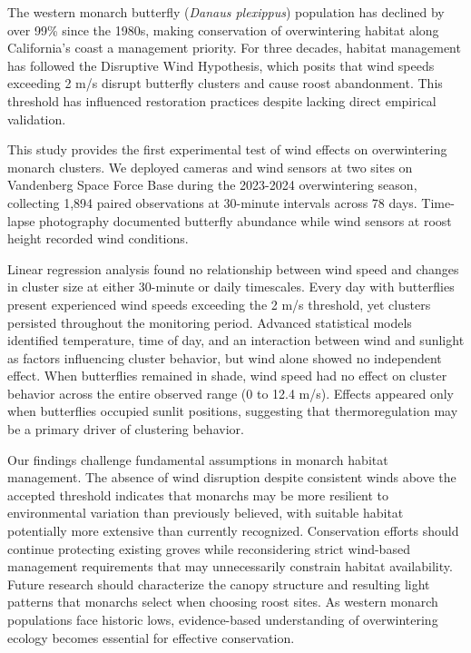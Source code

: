 The western monarch butterfly (\textit{Danaus plexippus}) population has declined by over 99\% since the 1980s, making conservation of overwintering habitat along California's coast a management priority. For three decades, habitat management has followed the Disruptive Wind Hypothesis, which posits that wind speeds exceeding 2 m/s disrupt butterfly clusters and cause roost abandonment. This threshold has influenced restoration practices despite lacking direct empirical validation.

This study provides the first experimental test of wind effects on overwintering monarch clusters. We deployed cameras and wind sensors at two sites on Vandenberg Space Force Base during the 2023-2024 overwintering season, collecting 1,894 paired observations at 30-minute intervals across 78 days. Time-lapse photography documented butterfly abundance while wind sensors at roost height recorded wind conditions.

Linear regression analysis found no relationship between wind speed and changes in cluster size at either 30-minute or daily timescales. Every day with butterflies present experienced wind speeds exceeding the 2 m/s threshold, yet clusters persisted throughout the monitoring period. Advanced statistical models identified temperature, time of day, and an interaction between wind and sunlight as factors influencing cluster behavior, but wind alone showed no independent effect. When butterflies remained in shade, wind speed had no effect on cluster behavior across the entire observed range (0 to 12.4 m/s). Effects appeared only when butterflies occupied sunlit positions, suggesting that thermoregulation may be a primary driver of clustering behavior.

Our findings challenge fundamental assumptions in monarch habitat management. The absence of wind disruption despite consistent winds above the accepted threshold indicates that monarchs may be more resilient to environmental variation than previously believed, with suitable habitat potentially more extensive than currently recognized. Conservation efforts should continue protecting existing groves while reconsidering strict wind-based management requirements that may unnecessarily constrain habitat availability. Future research should characterize the canopy structure and resulting light patterns that monarchs select when choosing roost sites. As western monarch populations face historic lows, evidence-based understanding of overwintering ecology becomes essential for effective conservation.